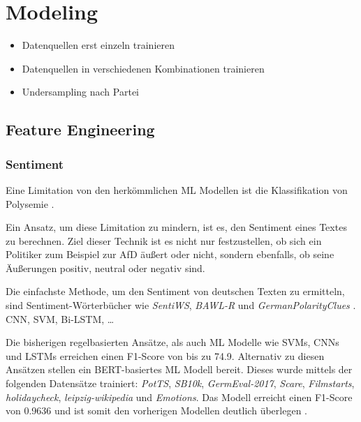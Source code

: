 \section{Modeling} \label{sec:modeling}


\begin{itemize}
    \item Datenquellen erst einzeln trainieren
    \item Datenquellen in verschiedenen Kombinationen trainieren
    \item Undersampling nach Partei 
\end{itemize}

\subsection{Feature Engineering} \label{subsec:featureEngineering}


\subsubsection{Sentiment}

Eine Limitation von den herkömmlichen \ac{ML} Modellen ist die Klassifikation von Polysemie \autocite[48\psq]{kowsari_text_2019}. 


Ein Ansatz, um diese Limitation zu mindern, ist es, den Sentiment eines Textes zu berechnen. Ziel dieser Technik ist es nicht nur festzustellen, ob sich ein Politiker zum Beispiel zur \ac{AfD} äußert oder nicht, sondern ebenfalls, ob seine Äußerungen positiv, neutral oder negativ sind.


Die einfachste Methode, um den Sentiment von deutschen Texten zu ermitteln, sind Sentiment-Wörterbücher wie \textit{SentiWS}, \textit{BAWL-R} und \textit{GermanPolarityClues} \autocite[1627\psq]{guhr_training_2020}. CNN, SVM, Bi-LSTM, \dots

Die bisherigen regelbasierten Ansätze, als auch \ac{ML} Modelle wie \acp{SVM}, \acp{CNN} und \acp{LSTM} erreichen einen F1-Score von bis zu \num{74.9}. Alternativ zu diesen Ansätzen stellen \textcite{guhr_training_2020} ein \ac{BERT}-basiertes \ac{ML} Modell bereit. Dieses wurde mittels der folgenden Datensätze trainiert: \textit{PotTS}, \textit{SB10k}, \textit{GermEval-2017}, \textit{Scare}, \textit{Filmstarts}, \textit{holidaycheck}, \textit{leipzig-wikipedia} und \textit{Emotions}. Das Modell erreicht einen F1-Score von \num{0.9636} und ist somit den vorherigen Modellen deutlich überlegen \autocite[1631]{guhr_training_2020}.

